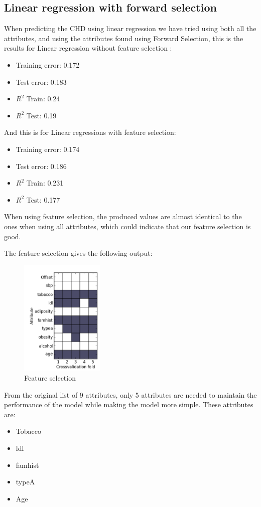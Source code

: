 \subsection{Linear regression with forward selection}
\label{ForwardSelection}
When predicting the CHD using linear regression we have tried using both all the attributes, and using the attributes found using Forward Selection, this is the results for Linear regression without feature selection :
\begin{itemize}
\item Training error: 0.172
\item Test error: 0.183
\item $R^{2}$ Train: 0.24
\item $R^{2}$ Test: 0.19
\end{itemize}
And this is for Linear regressions with feature selection:
\begin{itemize}
\item Training error: 0.174
\item Test error: 0.186
\item $R^{2}$ Train: 0.231
\item $R^{2}$ Test: 0.177
\end{itemize}
When using feature selection, the produced values are almost identical to the ones when using all attributes, which could indicate that our feature selection is good.

The feature selection gives the following output:
\begin{figure}[H]
\centering
\includegraphics[width=4cm, keepaspectratio=true]{pictures/cv_fold.png}
\caption{Feature selection}
\label{featureSelection}
\end{figure}
From the original list of 9 attributes, only 5 attributes are needed to maintain the performance of the model while making the model more simple. These attributes are:
\begin{itemize}
\item Tobacco
\item ldl
\item famhist
\item typeA
\item Age
\end{itemize}



